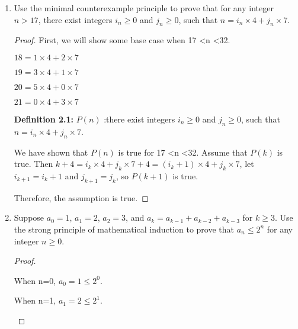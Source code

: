 \documentclass[12pt,a4paper]{article}
\theoremstyle{definition}
\begin{document}
\begin{enumerate}
\begin{proof}
(ii)It obviously that $n !$ is not a prime,so from Claim 2.2, we can know that $n !$ has prime factorization, so there must be a prime $p$ that satisfies $p$ \textless $n ! $ . To show $p$ must be greater than $n$, we can first assume that $p$ $\le$ $n$. From Claim 1.1 and 1.2 we know that $n!-1$ has  prime factor, we can assume that $p$ is a factor of $n!-1$ which is smaller than n.

Then $p$ must also be a factor of $n !$ , because $p$ is both the factor of $n!$ and $n!-1$, $p$ can only be 1, which contradicts the fact that $p$ is a prime.

Therefore, the assumption is true.
	\end{proof}
    \item
    Use the minimal counterexample principle to prove that for any integer $n>17$, there exist integers $i_n\ge 0$ and $j_n\ge 0$, such that $n = i_n \times 4 + j_n \times 7$.
    \begin{proof}
        First, we will show some base case when 17 \textless n \textless 32.
    \begin{center}    
        $18=1\times4+2\times7$
        
        $19=3\times4+1\times7$
        
        $20=5\times4+0\times7$
        
        $21=0\times4+3\times7$
    
    \end{center}
	\textbf{Definition 2.1: } $P(n)$ :there exist integers $i_n\ge 0$ and $j_n\ge 0$, such that $n = i_n \times 4 + j_n \times 7$.
	
	We have shown that $P(n)$ is true for 17 \textless n \textless 32. Assume that $P(k)$ is true. Then $k+4=i_k \times 4 +j_k \times 7+4=(i_k+1) \times 4 +j_k \times 7$, let $i_{k+1}=i_k+1$ and $j_{k+1}=j_k$, so $P(k+1)$ is true.
	
	Therefore, the assumption is true.
    \end{proof}

    \item
    Suppose $a_0=1$, $a_1=2$, $a_2=3$, and $a_k=a_{k-1}+a_{k-2}+a_{k-3}$ for $k \ge 3$. Use the strong principle of mathematical induction to prove that $a_n \le 2^n$ for any integer $n\ge 0$.
    \begin{proof}
    ~\\
    \begin{center}
      When n=0, $a_0=1\le 2^{0}$.
      
      When n=1, $a_1=2\le 2^{1}$.
      

\end{center}
\end{proof}
\end{enumerate}
\end{document}
